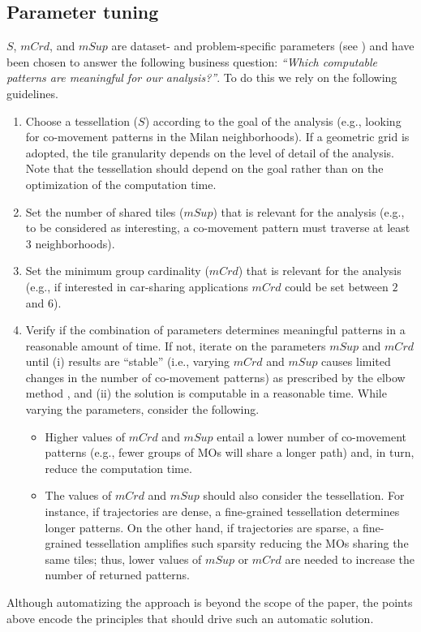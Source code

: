 \documentclass[preprint,12pt,authoryear]{elsarticle} %
\begin{document}
\subsection{Parameter tuning}
$S$, $mCrd$, and $mSup$ are dataset- and problem-specific parameters (see ) and have been chosen to answer the following business question: \textit{``Which computable patterns are meaningful for our analysis?''}.
To do this we rely on the following guidelines.
\begin{enumerate}
    \item Choose a tessellation ($S$) according to the goal of the analysis (e.g., looking for co-movement patterns in the Milan neighborhoods).
    If a geometric grid is adopted, the tile granularity depends on the level of detail of the analysis.
    Note that the tessellation should depend on the goal rather than on the optimization of the computation time.
    \item Set the number of shared tiles ($mSup$) that is relevant for the analysis (e.g., to be considered as interesting, a co-movement pattern must traverse at least 3 neighborhoods).
    \item Set the minimum group cardinality ($mCrd$) that is relevant for the analysis (e.g., if interested in car-sharing applications $mCrd$ could be set between $2$ and $6$). 
    \item Verify if the combination of parameters determines meaningful patterns in a reasonable amount of time.
    If not, iterate on the parameters $mSup$ and $mCrd$ until (i) results are ``stable'' (i.e., varying $mCrd$ and $mSup$ causes limited changes in the number of co-movement patterns) as prescribed by the elbow method \citep{DBLP:conf/icdcsw/SatopaaAIR11}, and (ii) the solution is computable in a reasonable time.
    While varying the parameters, consider the following.
    \begin{itemize}
        \item Higher values of $mCrd$ and $mSup$ entail a lower number of co-movement patterns (e.g., fewer groups of MOs will share a longer path) and, in turn, reduce the computation time. 
        \item The values of $mCrd$ and $mSup$ should also consider the tessellation.
        For instance, if trajectories are dense, a fine-grained tessellation determines longer patterns.
        On the other hand, if trajectories are sparse, a fine-grained tessellation amplifies such sparsity reducing the MOs sharing the same tiles; thus, lower values of $mSup$ or $mCrd$ are needed to increase the number of returned patterns.
    \end{itemize}
\end{enumerate}
Although automatizing the approach is beyond the scope of the paper, the points above encode the principles that should drive such an automatic solution.
\end{document}
